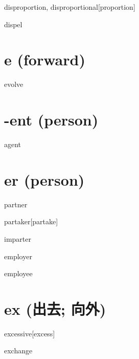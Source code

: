 \begin{wordRef}{disproportion, disproportional}[proportion]
\end{wordRef}

\begin{wordRef}{dispel}
    
\end{wordRef}

\section{e (forward)}

\begin{wordRef}{evolve}
\end{wordRef}

\section{-ent (person)}

\begin{wordRef}{agent}
\end{wordRef}

\section{er (person)}

\begin{wordRef}{partner}
\end{wordRef}

\begin{wordRef}{partaker}[partake]
\end{wordRef}

\begin{wordRef}{imparter}
\end{wordRef}

\begin{wordRef}{employer}
\end{wordRef}

\begin{wordRef}{employee}
\end{wordRef}

\section{ex (出去; 向外)}

\begin{wordRef}{excessive}[excess]
\end{wordRef}

\begin{wordRef}{exchange}
\end{wordRef}

